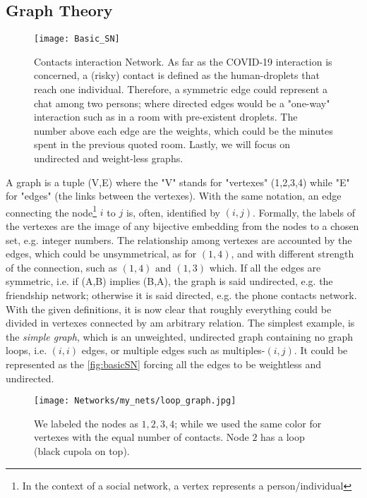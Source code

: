 \documentclass[a4paper,10pt, oneside]{book} %
\theoremstyle{definition}
\begin{document}
\subsection{Graph Theory}
\label{sec:GraphTheory}
\begin{figure}[htbp]
	\centering
	\texttt{[image: Basic\_SN]}
	\caption{Contacts interaction Network. As far as the COVID-19 interaction is concerned, a (risky) contact is defined as the human-droplets that reach one individual. Therefore, a symmetric edge could represent a chat among two persons; where directed edges would be a "one-way" interaction such as in a room with pre-existent droplets. The number above each edge are the weights, which could be the minutes spent in the previous quoted room. Lastly, we will focus on undirected and weight-less graphs.}
	\label{fig:basicSN}
\end{figure}

A graph is a tuple (V,E) where the "V" stands for "vertexes" (1,2,3,4) while "E" for "edges" (the links between the vertexes).
With the same notation, an edge connecting the node\footnote{In the context of a social network, a vertex represents a person/individual} $i$ to $j$ is, often, identified by $(i,j)$.
Formally, the labels of the vertexes are the image of any bijective embedding from the nodes to a chosen set, e.g. integer numbers. The relationship among vertexes are accounted by the edges, which could be unsymmetrical, as for $(1,4)$, and with different strength of the connection, such as $(1,4) \text{ and } (1,3)$ which. If all the edges are symmetric, i.e. if (A,B) implies (B,A), the graph is said undirected, e.g. the friendship network; otherwise it is said directed, e.g. the phone contacts network. 
With the given definitions, it is now clear that roughly everything could be divided in vertexes connected by am arbitrary relation.
The simplest example, is the \textit{simple graph}, which is an unweighted, undirected graph containing no graph loops, i.e. $(i,i)$ edges, or multiple edges such as multiples-$(i,j)$. It could be represented as the \autoref{fig:basicSN} forcing all the edges to be weightless and undirected.
\begin{figure}[ht]
	\centering
	\texttt{[image: Networks/my\_nets/loop\_graph.jpg]}
	\caption{We labeled the nodes as $1,2,3,4$; while we used the same color for vertexes with the equal number of contacts. Node $ 2$ has a loop (black cupola on top).}
	\label{fig:simple}
\end{figure}
\end{document}
